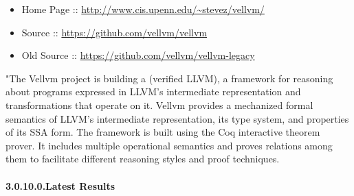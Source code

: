 \documentclass[12pt,twoside]{article}
\begin{document}
\begin{itemize}[noitemsep,topsep=\mdcompacttopsep]%

\item{}Home Page :: \href{http://www.cis.upenn.edu/~stevez/vellvm/}{{\ttfamily http://\hspace{0pt}www.\hspace{0pt}cis.\hspace{0pt}upenn.\hspace{0pt}edu/\hspace{0pt}\textasciitilde{}stevez/\hspace{0pt}vellvm/\hspace{0pt}}}%

\item{}Source :: \href{https://github.com/vellvm/vellvm}{{\ttfamily https://\hspace{0pt}github.\hspace{0pt}com/\hspace{0pt}vellvm/\hspace{0pt}vellvm}}%

\item{}Old Source :: \href{https://github.com/vellvm/vellvm-legacy}{{\ttfamily https://\hspace{0pt}github.\hspace{0pt}com/\hspace{0pt}vellvm/\hspace{0pt}vellvm-\hspace{0pt}legacy}}%
\end{itemize}%

\noindent{}"The Vellvm project is building a (verified LLVM), a framework for
reasoning about programs expressed in LLVM's intermediate
representation and transformations that operate on it. Vellvm provides
a mechanized formal semantics of LLVM's intermediate representation,
its type system, and properties of its SSA form. The framework is
built using the Coq interactive theorem prover. It includes multiple
operational semantics and proves relations among them to facilitate
different reasoning styles and proof techniques.%

\paragraph{3.0.10.0.\hspace*{0.5em}Latest Results}\label{sec-latest-results}%
\end{document}
